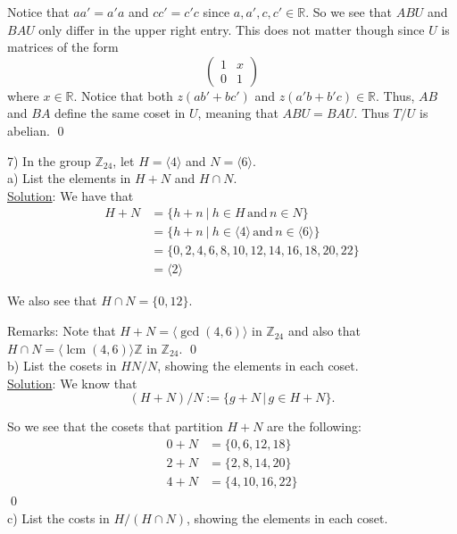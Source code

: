 \documentclass{article}
\DeclareMathOperator{\lcm}{lcm}
\begin{document}
Notice that $aa' = a'a$ and $cc' = c'c$ since $a, a', c, c' \in \mathbb{R}$. So we see that $ABU$ and $BAU$ only differ in the upper right entry. This does not matter though since $U$ is matrices of the form 
$$\begin{pmatrix}
1 & x \\
0 & 1
\end{pmatrix}$$ where $x \in \mathbb{R}$. Notice that both $z(ab' + bc')$ and $z(a'b + b'c) \in \mathbb{R}$. Thus, $AB$ and $BA$ define the same coset in $U$, meaning that $ABU = BAU$. Thus $T/U$ is abelian. \qed \pagebreak

7) In the group $\mathbb{Z}_{24}$, let $H = \langle 4 \rangle$ and $N = \langle 6 \rangle.$\\

a) List the elements in $H + N$ and $H \cap N$.\\

\underline{Solution}: We have that
\begin{align*}
	H+N &= \{ h + n \ \vert \ h \in H \, \text{and} \, n \in N\} \\
	&= \{ h + n \ \vert \ h \in \langle 4 \rangle \, \text{and} \, n \in \langle 6 \rangle\} \\
	&= \{ 0, 2, 4, 6, 8, 10, 12, 14, 16, 18, 20, 22 \} \\
	&= \langle 2 \rangle
\end{align*}

We also see that $H \cap N = \{ 0, 12 \}.$

Remarks: Note that $H + N = \big\langle \gcd(4,6) \big\rangle $ in $\mathbb{Z}_{24}$ and also that $H \cap N = \big\langle \lcm(4, 6) \big\rangle \mathbb{Z}$ in $\mathbb{Z}_{24}$. \qed \\

b) List the cosets in $HN/N$, showing the elements in each coset.\\

\underline{Solution}: We know that 
$$ (H + N) / N := \{ g + N \, \vert \, g \in H + N\}. $$

So we see that the cosets that partition $H+N$ are the following:
\begin{align*}
	0 + N &= \{ 0, 6, 12, 18\} \\
	2 + N &= \{ 2, 8, 14, 20 \} \\
	4 + N &= \{ 4, 10, 16, 22\}
\end{align*} \qed \\

c) List the costs in $H/(H \cap N)$, showing the elements in each coset.\\
\end{document}
